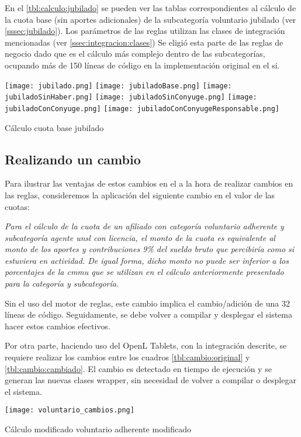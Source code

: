 En el \cref{tbl:calculo:jubilado} se pueden ver las tablas correspondientes al cálculo de la cuota base (sin aportes adicionales) de la subcategoría voluntario jubilado (ver \cref{sssec:jubilado}). Los parámetros de las reglas utilizan las clases de integración mencionadas (ver \cref{ssec:integracion:clases}) Se eligió esta parte de las reglas de negocio dado que es el cálculo más complejo dentro de las subcategorías, ocupando más de 150 líneas de código en la implementación original en el \acrshort{si}.

\begin{table*}
    \centering
    \texttt{[image: jubilado.png]}
    \texttt{[image: jubiladoBase.png]}
    \texttt{[image: jubiladoSinHaber.png]}
    \texttt{[image: jubiladoSinConyuge.png]}
    \texttt{[image: jubiladoConConyuge.png]}
    \texttt{[image: jubiladoConConyugeResponsable.png]}
    \caption{Cálculo cuota base jubilado}
    \label{tbl:calculo:jubilado}
\end{table*}

\subsection{Realizando un cambio}\label{ssec:integracion:cambio}
Para ilustrar las ventajas de estos cambios en el \SIDOSPU a la hora de realizar cambios en las reglas, consideremos la aplicación del siguiente cambio en el valor de las cuotas:

\emph{
Para el cálculo de la cuota de un afiliado con categoría voluntario adherente y subcategoría agente \acrshort{unsl} con licencia, el monto de la cuota es equivalente al monto de los aportes y contribuciones 9\% del sueldo bruto que percibiría como si estuviera en actividad. De igual forma, dicho monto no puede ser inferior a los porcentajes de la \acrshort{cmmu} que se utilizan en el cálculo anteriormente presentado para la categoría y subcategoría.
}

Sin el uso del motor de reglas, este cambio implica el cambio/adición de una 32 líneas de código. Seguidamente, se debe volver a compilar y desplegar el sistema hacer estos cambios efectivos.

Por otra parte, haciendo uso del OpenL Tablets, con la integración descrite, se requiere realizar los cambios entre los cuadros \ref{tbl:cambio:original} y \ref{tbl:cambio:cambiado}. El cambio es detectado en tiempo de ejecución y se generan las nuevas clases wrapper, sin necesidad de volver a compilar o desplegar el sistema.



\begin{table*}
    \centering
    \texttt{[image: voluntario\_cambios.png]}
    \caption{Cálculo modificado voluntario adherente modificado}
    \label{tbl:cambio:cambiado}
\end{table*}
